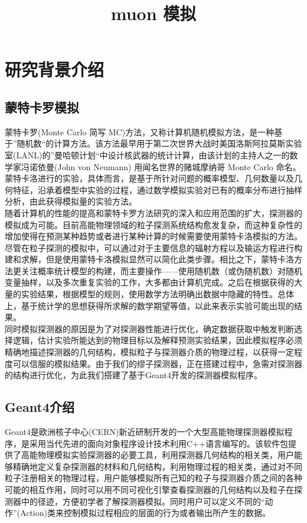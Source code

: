 \documentclass[UTF8]{ctexart}
\title{muon 模拟}
\begin{document}
\section{研究背景介绍}
\subsection{蒙特卡罗模拟}

蒙特卡罗(Monte Carlo 简写 MC)方法，又称计算机随机模拟方法，是一种基于”随机数“的计算方法。该方法最早用于第二次世界大战时美国洛斯阿拉莫斯实验室(LANL)的”曼哈顿计划“中设计核武器的统计计算，由该计划的主持人之一的数学家冯诺依曼(John von Neumann) 用闻名世界的赌城摩纳哥 Monte Carlo 命名。蒙特卡洛进行的实验，具体而言，是基于所针对问题的概率模型、几何数量以及几何特征，沿承着模型中实验的过程，通过数学模拟实验对已有的概率分布进行抽样分析，由此获得模拟量的实验方法。\\

随着计算机的性能的提高和蒙特卡罗方法研究的深入和应用范围的扩大，探测器的模拟成为可能。目前高能物理领域的粒子探测系统结构愈发复杂，而这种复杂性的增加使得在预测某种趋势或者进行某种计算的时候需要使用蒙特卡洛模拟的方法。尽管在粒子探测的模拟中，可以通过对于主要信息的辐射方程以及输运方程进行构建和求解，但是使用蒙特卡洛模拟显然可以简化此类步骤。相比之下，蒙特卡洛方法更关注概率统计模型的构建，而主要操作——使用随机数（或伪随机数）对随机变量抽样，以及多次重复实验的工作，大多都由计算机完成。之后在根据获得的大量的实验结果，根据模型的规则，使用数学方法明确出数据中隐藏的特性。总体上，基于统计学的思想获得所求解的数学期望等值，以此来表示实验可能出现的结果。\\

同时模拟探测器的原因是为了对探测器性能进行优化，确定数据获取中触发判断选择逻辑，估计实验所能达到的物理目标以及解释预测实验结果，因此模拟程序必须精确地描述探测器的几何结构，模拟粒子与探测器介质的物理过程，以获得一定程度可以信服的模拟结果。由于我们的缪子探测器，正在搭建过程中，急需对探测器的结构进行优化，为此我们搭建了基于Geant4开发的探测器模拟程序。

\subsection{Geant4介绍}

Geant4是欧洲核子中心(CERN)新近研制开发的一个大型高能物理探测器模拟程序，是采用当代先进的面向对象程序设计技术利用C++语言编写的。\cite{1}该软件包提供了高能物理模拟实验探测器的必要工具，利用探测器几何结构的相关类，用户能够精确地定义复杂探测器的材料和几何结构，利用物理过程的相关类，通过对不同粒子注册相关的物理过程，用户能够模拟所有己知的粒子与探测器介质之间的各种可能的相互作用，同时可以用不同可视化引擎查看探测器的几何结构以及粒子在探测器中的径迹，方便初学者了解探测器模拟。同时用户可以定义不同的“动作”(Action)类来控制模拟过程相应的层面的行为或者输出所产生的数据。
\end{document}
